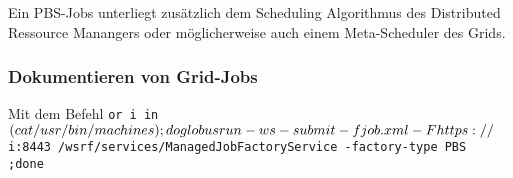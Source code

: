 		Ein PBS-Jobs unterliegt zusätzlich dem Scheduling Algorithmus des
		Distributed Ressource Manangers %
		oder möglicherweise auch einem Meta-Scheduler des Grids.
	
	\subsubsection{Dokumentieren von Grid-Jobs}
		Mit dem Befehl
		\texttt{or i in $(cat /usr/bin/machines); do \\
		globusrun-ws -submit -f job.xml -F https://${i}:8443 /wsrf/services/ManagedJobFactoryService -factory-type PBS \\
		;done}

	
		

